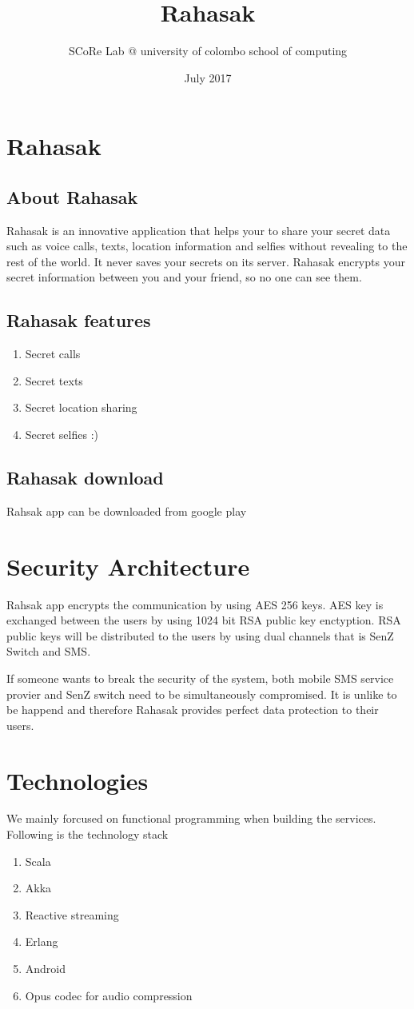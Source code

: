 \documentclass{article}
\title{Rahasak}
\author{SCoRe Lab @ university of colombo school of computing}
\date{July 2017}
\begin{document}
\maketitle
\section{Rahasak}

\subsection{About Rahasak}

Rahasak is an innovative application that helps your to share your secret data
such as voice calls, texts, location information and selfies without revealing
to the rest of the world. It never saves your secrets on its server. Rahasak 
encrypts your secret information between you and your friend, so no one can 
see them.

\subsection{Rahasak features}

\begin{enumerate}
\item Secret calls 
\item Secret texts
\item Secret location sharing
\item Secret selfies :)
\end{enumerate}

\subsection{Rahasak download}

Rahsak app can be downloaded from google play 
\newline

\section{Security Architecture}
Rahsak app encrypts the communication by using AES 256 keys. AES key is 
exchanged between the users by using 1024 bit RSA public key enctyption. RSA 
public keys will be distributed to the users by using dual channels that is 
SenZ Switch and SMS. 

If someone wants to break the security of the system, both mobile SMS service 
provier and SenZ switch need to be simultaneously compromised. It is unlike to 
be happend and therefore Rahasak provides perfect data protection to their 
users.

\section{Technologies}

We mainly forcused on functional programming when building the services. 
Following is the technology stack

\begin{enumerate}
\item Scala 
\item Akka 
\item Reactive streaming
\item Erlang 
\item Android
\item Opus codec for audio compression
\end{enumerate}
\end{document}
